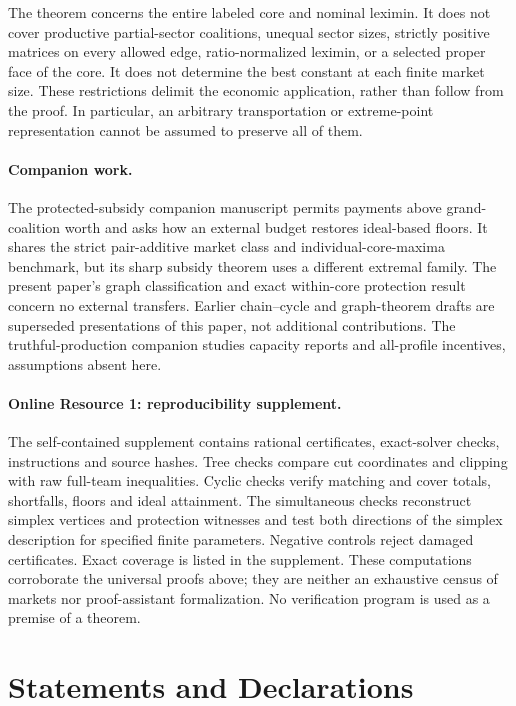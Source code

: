 \documentclass[11pt]{article}
\theoremstyle{remark}\newtheorem{remark}[theorem]{Remark}
\begin{document}
The theorem concerns the entire labeled core and nominal leximin. It does not
cover productive partial-sector coalitions, unequal sector sizes, strictly
positive matrices on every allowed edge, ratio-normalized leximin, or a
selected proper face of the core. It does not determine the best constant at
each finite market size. These restrictions delimit the economic application,
rather than follow from the proof. In particular, an arbitrary transportation
or extreme-point representation cannot be assumed to preserve all of them.

\paragraph{Companion work.}
The protected-subsidy companion manuscript permits payments above grand-coalition
worth and asks how an external budget restores ideal-based floors. It shares
the strict pair-additive market class and individual-core-maxima benchmark,
but its sharp subsidy theorem uses a different extremal family. The present
paper's graph classification and exact within-core protection result concern
no external transfers. Earlier
chain--cycle and graph-theorem drafts are superseded presentations of this
paper, not additional contributions. The truthful-production companion studies
capacity reports and all-profile incentives, assumptions absent here.

\paragraph{Online Resource 1: reproducibility supplement.}
The self-contained supplement contains rational certificates, exact-solver
checks, instructions and source hashes. Tree checks compare cut coordinates
and clipping with raw full-team inequalities. Cyclic checks verify matching
and cover totals, shortfalls, floors and ideal attainment. The simultaneous
checks reconstruct simplex vertices and protection witnesses and test both
directions of the simplex description for specified finite parameters.
Negative controls reject damaged certificates. Exact coverage is listed in
the supplement. These computations corroborate the universal proofs above;
they are neither an exhaustive census of markets nor proof-assistant
formalization. No verification program is used as a premise of a theorem.

\section*{Statements and Declarations}
\end{document}

